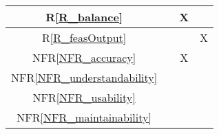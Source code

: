 \documentclass[12pt]{article}
\newcommand{\rref}[1]{R\ref{#1}}
\newcommand{\nfrref}[1]{NFR\ref{#1}}
\begin{document}
\begin{table}[h!]
{\begin{tabular}{|c|c|c|c|}
      \rref{R_balance}               &                & X               &                \\ \hline %
      \rref{R_feasOutput}            &                &                 & X              \\ \hline %
      \nfrref{NFR_accuracy}          &                & X               &                \\ \hline %
      \nfrref{NFR_understandability} &                &                 &                \\ \hline %
      \nfrref{NFR_usability}         &                &                 &                \\ \hline %
      \nfrref{NFR_maintainability}   &                &                 &                \\ \hline %

\end{tabular}}
\end{table}
\end{document}
